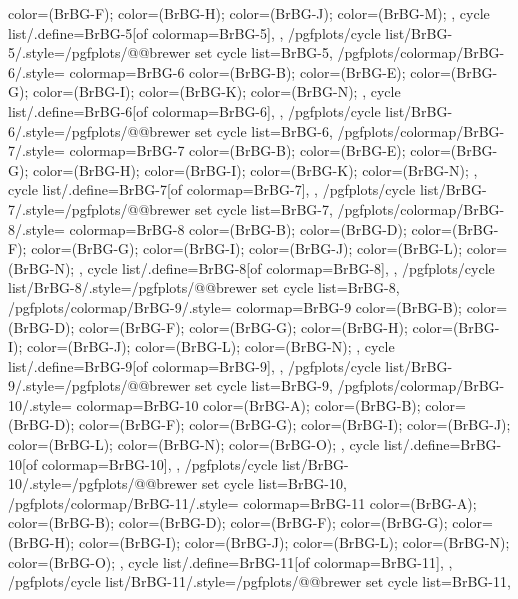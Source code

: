 {{{      color=(BrBG-F);
      color=(BrBG-H);
      color=(BrBG-J);
      color=(BrBG-M);
    },
    cycle list/.define={BrBG-5}{[of colormap=BrBG-5]},
  },
  /pgfplots/cycle list/BrBG-5/.style={/pgfplots/@@brewer set cycle list={BrBG-5}},
  /pgfplots/colormap/BrBG-6/.style={
    colormap={BrBG-6}{
      color=(BrBG-B);
      color=(BrBG-E);
      color=(BrBG-G);
      color=(BrBG-I);
      color=(BrBG-K);
      color=(BrBG-N);
    },
    cycle list/.define={BrBG-6}{[of colormap=BrBG-6]},
  },
  /pgfplots/cycle list/BrBG-6/.style={/pgfplots/@@brewer set cycle list={BrBG-6}},
  /pgfplots/colormap/BrBG-7/.style={
    colormap={BrBG-7}{
      color=(BrBG-B);
      color=(BrBG-E);
      color=(BrBG-G);
      color=(BrBG-H);
      color=(BrBG-I);
      color=(BrBG-K);
      color=(BrBG-N);
    },
    cycle list/.define={BrBG-7}{[of colormap=BrBG-7]},
  },
  /pgfplots/cycle list/BrBG-7/.style={/pgfplots/@@brewer set cycle list={BrBG-7}},
  /pgfplots/colormap/BrBG-8/.style={
    colormap={BrBG-8}{
      color=(BrBG-B);
      color=(BrBG-D);
      color=(BrBG-F);
      color=(BrBG-G);
      color=(BrBG-I);
      color=(BrBG-J);
      color=(BrBG-L);
      color=(BrBG-N);
    },
    cycle list/.define={BrBG-8}{[of colormap=BrBG-8]},
  },
  /pgfplots/cycle list/BrBG-8/.style={/pgfplots/@@brewer set cycle list={BrBG-8}},
  /pgfplots/colormap/BrBG-9/.style={
    colormap={BrBG-9}{
      color=(BrBG-B);
      color=(BrBG-D);
      color=(BrBG-F);
      color=(BrBG-G);
      color=(BrBG-H);
      color=(BrBG-I);
      color=(BrBG-J);
      color=(BrBG-L);
      color=(BrBG-N);
    },
    cycle list/.define={BrBG-9}{[of colormap=BrBG-9]},
  },
  /pgfplots/cycle list/BrBG-9/.style={/pgfplots/@@brewer set cycle list={BrBG-9}},
  /pgfplots/colormap/BrBG-10/.style={
    colormap={BrBG-10}{
      color=(BrBG-A);
      color=(BrBG-B);
      color=(BrBG-D);
      color=(BrBG-F);
      color=(BrBG-G);
      color=(BrBG-I);
      color=(BrBG-J);
      color=(BrBG-L);
      color=(BrBG-N);
      color=(BrBG-O);
    },
    cycle list/.define={BrBG-10}{[of colormap=BrBG-10]},
  },
  /pgfplots/cycle list/BrBG-10/.style={/pgfplots/@@brewer set cycle list={BrBG-10}},
  /pgfplots/colormap/BrBG-11/.style={
    colormap={BrBG-11}{
      color=(BrBG-A);
      color=(BrBG-B);
      color=(BrBG-D);
      color=(BrBG-F);
      color=(BrBG-G);
      color=(BrBG-H);
      color=(BrBG-I);
      color=(BrBG-J);
      color=(BrBG-L);
      color=(BrBG-N);
      color=(BrBG-O);
    },
    cycle list/.define={BrBG-11}{[of colormap=BrBG-11]},
  },
  /pgfplots/cycle list/BrBG-11/.style={/pgfplots/@@brewer set cycle list={BrBG-11}},
}
